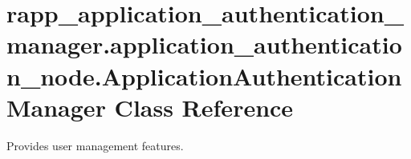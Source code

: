 \hypertarget{classrapp__application__authentication__manager_1_1application__authentication__node_1_1ApplicationAuthenticationManager}{\section{rapp\-\_\-application\-\_\-authentication\-\_\-manager.\-application\-\_\-authentication\-\_\-node.\-Application\-Authentication\-Manager Class Reference}
\label{classrapp__application__authentication__manager_1_1application__authentication__node_1_1ApplicationAuthenticationManager}
}


Provides user management features.  


